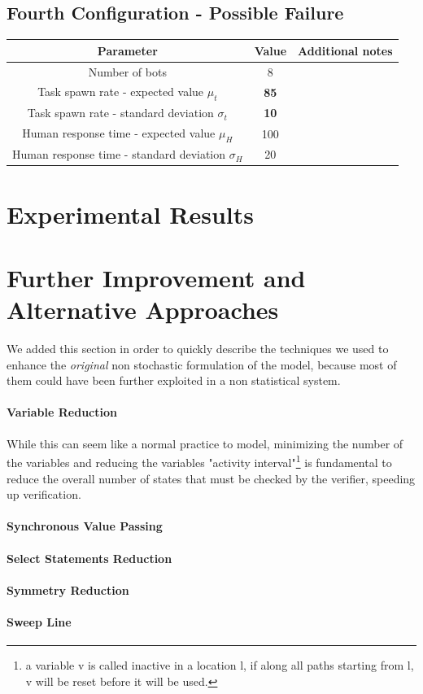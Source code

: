 \documentclass[10pt,a4paper]{article}
\begin{document}
		\subsection{Fourth Configuration - Possible Failure}
			\begin{center}
				\begin{tabular}{ |c|c|c|}
					\hline
					Parameter & Value & Additional notes\\
					\hline
					\hline
					Number of bots & 8 &\\
					\hline
					Task spawn rate - expected value $\mu_t$ & \textbf{85} &\\
					\hline					
					Task spawn rate - standard deviation $\sigma_t$ & \textbf{10} &\\
					\hline
					Human response time - expected value $\mu_H$ & 100 &\\
					\hline					
					Human response time - standard deviation $\sigma_H$ & 20 &\\
					\hline
				\end{tabular}
			\end{center}
	
	\section{Experimental Results}
	
	\section{Further Improvement and Alternative Approaches} %
		We added this section in order to quickly describe the techniques we used to enhance the \emph{original} non stochastic formulation of the model, because most of them could have been further exploited in a non statistical system.
		
		\paragraph{Variable Reduction}
			While this can seem like a normal practice to model, minimizing the number of the variables and reducing the variables "activity interval"\footnote{a variable v is called inactive in a location l, if along all paths starting from l, v will be reset before it will be used.} is fundamental to reduce the overall number of states that must be checked by the verifier, speeding up verification.
			
		\paragraph{Synchronous Value Passing}
		
		\paragraph{Select Statements Reduction}
		
		\paragraph{Symmetry Reduction}
		
		\paragraph{Sweep Line}
		
	
\end{document}
